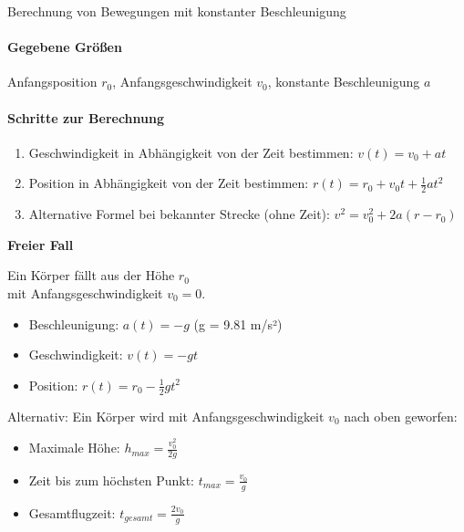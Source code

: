 \begin{KR}{Berechnung von Bewegungen mit konstanter Beschleunigung}
    \paragraph{Gegebene Größen}
    Anfangsposition $r_0$, Anfangsgeschwindigkeit $v_0$, konstante Beschleunigung $a$
    
    \paragraph{Schritte zur Berechnung}
    \begin{enumerate}
        \item Geschwindigkeit in Abhängigkeit von der Zeit bestimmen:
        $
            v(t) = v_0 + at
        $
        
        \item Position in Abhängigkeit von der Zeit bestimmen:
        $
            r(t) = r_0 + v_0t + \frac{1}{2}at^2
        $
        
        \item Alternative Formel bei bekannter Strecke (ohne Zeit):
        $
            v^2 = v_0^2 + 2a(r - r_0)
        $
    \end{enumerate}
\end{KR}




\begin{example} \textbf{Freier Fall}

    \begin{minipage}{0.5\linewidth}
    Ein Körper fällt aus der Höhe $r_0$\\ mit Anfangsgeschwindigkeit $v_0 = 0$.
    
    \begin{itemize}
        \item Beschleunigung: $a(t) = -g$ (g = 9.81 m/s²)
        \item Geschwindigkeit: $v(t) = -gt$
        \item Position: $r(t) = r_0 - \frac{1}{2}gt^2$
    \end{itemize}
    \end{minipage}
    \begin{minipage}{0.5\linewidth}    
    Alternativ: Ein Körper wird mit Anfangsgeschwindigkeit $v_0$ nach oben geworfen:
    \begin{itemize}
        \item Maximale Höhe: $h_{max} = \frac{v_0^2}{2g}$ 
        \item Zeit bis zum höchsten Punkt: $t_{max} = \frac{v_0}{g}$
        \item Gesamtflugzeit: $t_{gesamt} = \frac{2v_0}{g}$
    \end{itemize}
    \end{minipage}
\end{example}



